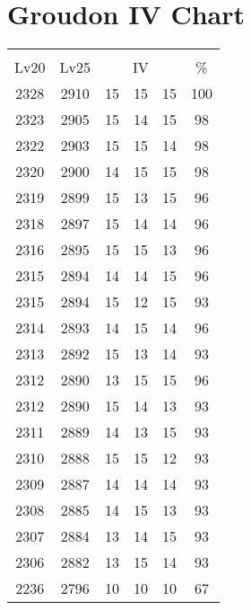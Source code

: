 \documentclass{article}%
\begin{document}
%
\normalsize%
\section{Groudon IV Chart}%
\label{sec:Groudon IV Chart}%
\renewcommand{\arraystretch}{1.5}%
\begin{tabular}{|c|c|c|c|c|c|}%
\hline%
\multicolumn{6}{|c|}{\textcolor{white}{ 
\linebreak{Groudon}
}%
\cellcolor{black}}\\%
\multicolumn{1}{|c}{Lv20}&\multicolumn{1}{c|}{Lv25}&\multicolumn{3}{c|}{IV}&\multicolumn{1}{|c|}{\%}\\%
\hline%
\rowcolor{color100}%
2328&2910&15&15&15&100\\%
\hline%
\rowcolor{color98}%
2323&2905&15&14&15&98\\%
\hline%
\rowcolor{color98}%
2322&2903&15&15&14&98\\%
\hline%
\rowcolor{color98}%
2320&2900&14&15&15&98\\%
\hline%
\rowcolor{color96}%
2319&2899&15&13&15&96\\%
\hline%
\rowcolor{color96}%
2318&2897&15&14&14&96\\%
\hline%
\rowcolor{color96}%
2316&2895&15&15&13&96\\%
\hline%
\rowcolor{color96}%
2315&2894&14&14&15&96\\%
\hline%
\rowcolor{color93}%
2315&2894&15&12&15&93\\%
\hline%
\rowcolor{color96}%
2314&2893&14&15&14&96\\%
\hline%
\rowcolor{color93}%
2313&2892&15&13&14&93\\%
\hline%
\rowcolor{color96}%
2312&2890&13&15&15&96\\%
\hline%
\rowcolor{color93}%
2312&2890&15&14&13&93\\%
\hline%
\rowcolor{color93}%
2311&2889&14&13&15&93\\%
\hline%
\rowcolor{color93}%
2310&2888&15&15&12&93\\%
\hline%
\rowcolor{color93}%
2309&2887&14&14&14&93\\%
\hline%
\rowcolor{color93}%
2308&2885&14&15&13&93\\%
\hline%
\rowcolor{color93}%
2307&2884&13&14&15&93\\%
\hline%
\rowcolor{color93}%
2306&2882&13&15&14&93\\%
\hline%
\rowcolor{color91}%
2236&2796&10&10&10&67\\%
\end{tabular}

%
\end{document}
